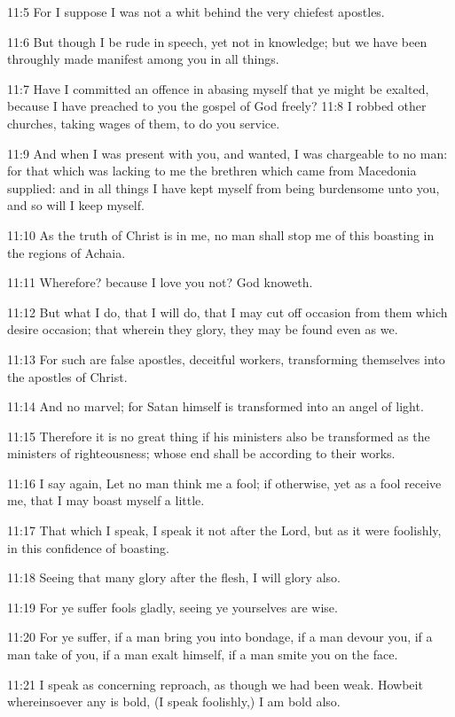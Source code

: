 11:5 For I suppose I was not a whit behind the very chiefest apostles.

11:6 But though I be rude in speech, yet not in knowledge; but we have
been throughly made manifest among you in all things.

11:7 Have I committed an offence in abasing myself that ye might be
exalted, because I have preached to you the gospel of God freely?
11:8 I robbed other churches, taking wages of them, to do you service.

11:9 And when I was present with you, and wanted, I was chargeable to
no man: for that which was lacking to me the brethren which came from
Macedonia supplied: and in all things I have kept myself from being
burdensome unto you, and so will I keep myself.

11:10 As the truth of Christ is in me, no man shall stop me of this
boasting in the regions of Achaia.

11:11 Wherefore? because I love you not? God knoweth.

11:12 But what I do, that I will do, that I may cut off occasion from
them which desire occasion; that wherein they glory, they may be found
even as we.

11:13 For such are false apostles, deceitful workers, transforming
themselves into the apostles of Christ.

11:14 And no marvel; for Satan himself is transformed into an angel of
light.

11:15 Therefore it is no great thing if his ministers also be
transformed as the ministers of righteousness; whose end shall be
according to their works.

11:16 I say again, Let no man think me a fool; if otherwise, yet as a
fool receive me, that I may boast myself a little.

11:17 That which I speak, I speak it not after the Lord, but as it
were foolishly, in this confidence of boasting.

11:18 Seeing that many glory after the flesh, I will glory also.

11:19 For ye suffer fools gladly, seeing ye yourselves are wise.

11:20 For ye suffer, if a man bring you into bondage, if a man devour
you, if a man take of you, if a man exalt himself, if a man smite you
on the face.

11:21 I speak as concerning reproach, as though we had been weak.
Howbeit whereinsoever any is bold, (I speak foolishly,) I am bold
also.

